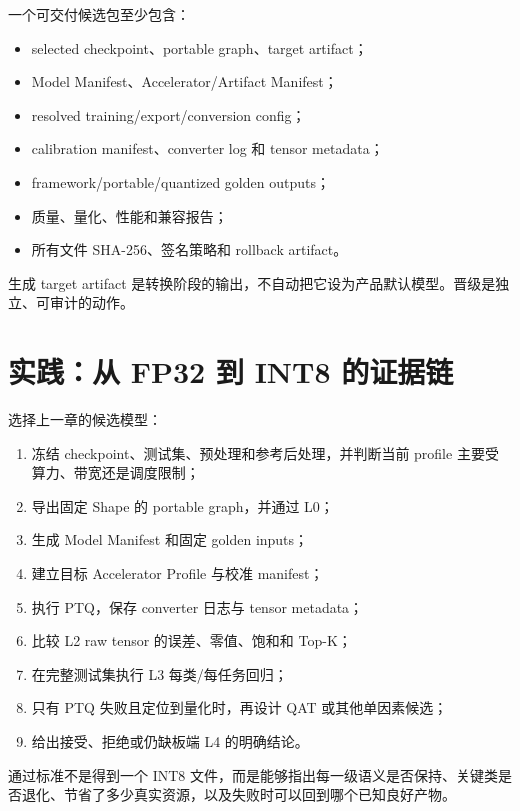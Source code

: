 一个可交付候选包至少包含：

\begin{itemize}
  \item selected checkpoint、portable graph、target artifact；
  \item Model Manifest、Accelerator/Artifact Manifest；
  \item resolved training/export/conversion config；
  \item calibration manifest、converter log 和 tensor metadata；
  \item framework/portable/quantized golden outputs；
  \item 质量、量化、性能和兼容报告；
  \item 所有文件 SHA-256、签名策略和 rollback artifact。
\end{itemize}

生成 target artifact 是转换阶段的输出，不自动把它设为产品默认模型。晋级是独立、可审计的动作。

\section{实践：从 FP32 到 INT8 的证据链}

选择上一章的候选模型：

\begin{enumerate}
  \item 冻结 checkpoint、测试集、预处理和参考后处理，并判断当前 profile 主要受算力、带宽还是调度限制；
  \item 导出固定 Shape 的 portable graph，并通过 L0；
  \item 生成 Model Manifest 和固定 golden inputs；
  \item 建立目标 Accelerator Profile 与校准 manifest；
  \item 执行 PTQ，保存 converter 日志与 tensor metadata；
  \item 比较 L2 raw tensor 的误差、零值、饱和和 Top-K；
  \item 在完整测试集执行 L3 每类/每任务回归；
  \item 只有 PTQ 失败且定位到量化时，再设计 QAT 或其他单因素候选；
  \item 给出接受、拒绝或仍缺板端 L4 的明确结论。
\end{enumerate}

通过标准不是得到一个 INT8 文件，而是能够指出每一级语义是否保持、关键类是否退化、节省了多少真实资源，以及失败时可以回到哪个已知良好产物。
